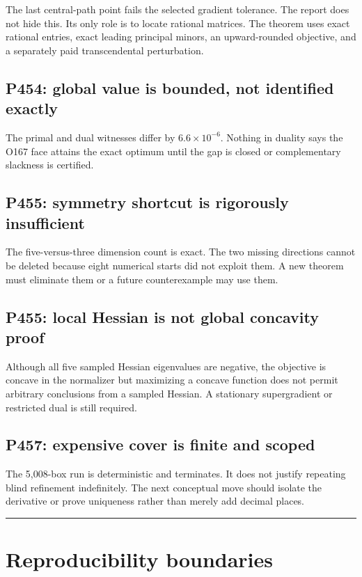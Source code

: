 \documentclass[11pt,a4paper,openany]{report}
\begin{document}
The last central-path point fails the selected gradient tolerance. The report does not hide this. Its only role is to locate rational matrices. The theorem uses exact rational entries, exact leading principal minors, an upward-rounded objective, and a separately paid transcendental perturbation.

\section{P454: global value is bounded, not identified exactly}

The primal and dual witnesses differ by \(6.6\times10^{-6}\). Nothing in duality says the O167 face attains the exact optimum until the gap is closed or complementary slackness is certified.

\section{P455: symmetry shortcut is rigorously insufficient}

The five-versus-three dimension count is exact. The two missing directions cannot be deleted because eight numerical starts did not exploit them. A new theorem must eliminate them or a future counterexample may use them.

\section{P455: local Hessian is not global concavity proof}

Although all five sampled Hessian eigenvalues are negative, the objective is concave in the normalizer but maximizing a concave function does not permit arbitrary conclusions from a sampled Hessian. A stationary supergradient or restricted dual is still required.

\section{P457: expensive cover is finite and scoped}

The 5,008-box run is deterministic and terminates. It does not justify repeating blind refinement indefinitely. The next conceptual move should isolate the derivative or prove uniqueness rather than merely add decimal places.

\par\medskip\hrule\medskip

\chapter{Reproducibility boundaries}
\end{document}
